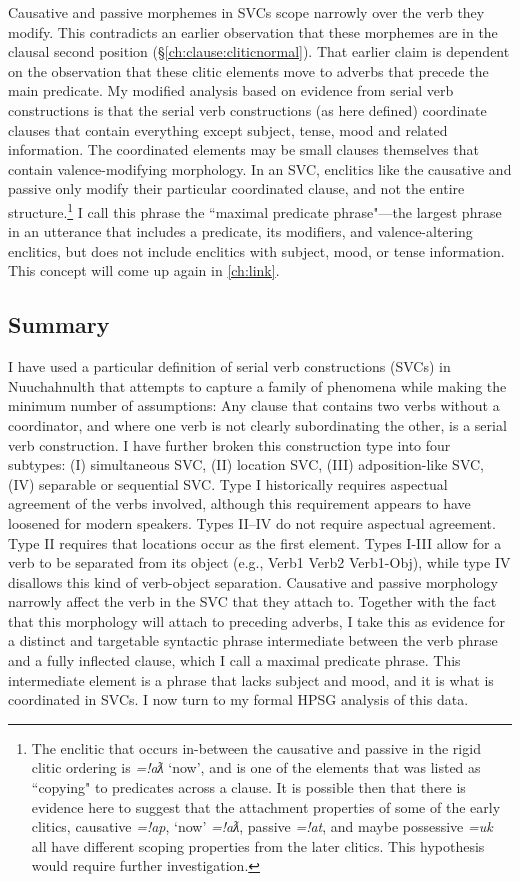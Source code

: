Causative and passive morphemes in SVCs scope narrowly over the verb they modify. This contradicts an earlier observation that these morphemes are in the clausal second position (\S\ref{ch:clause:cliticnormal}). That earlier claim is dependent on the observation that these clitic elements move to adverbs that precede the main predicate. My modified analysis based on evidence from serial verb constructions is that the serial verb constructions (as here defined) coordinate clauses that contain everything except subject, tense, mood and related information. The coordinated elements may be small clauses themselves that contain valence-modifying morphology. In an SVC, enclitics like the causative and passive only modify their particular coordinated clause, and not the entire structure.\footnote{The enclitic that occurs in-between the causative and passive in the rigid clitic ordering is \textit{=!aƛ} `now', and is one of the elements that was listed as ``copying" to predicates across a clause. It is possible then that there is evidence here to suggest that the attachment properties of some of the early clitics, causative \textit{=!ap}, `now' \textit{=!aƛ}, passive \textit{=!at}, and maybe possessive \textit{=uk} all have different scoping properties from the later clitics. This hypothesis would require further investigation.} I call this phrase the ``maximal predicate phrase"---the largest phrase in an utterance that includes a predicate, its modifiers, and valence-altering enclitics, but does not include enclitics with subject, mood, or tense information. This concept will come up again in \cref{ch:link}.

\subsection{Summary}

I have used a particular definition of serial verb constructions (SVCs) in Nuuchahnulth that attempts to capture a family of phenomena while making the minimum number of assumptions: Any clause that contains two verbs without a coordinator, and where one verb is not clearly subordinating the other, is a serial verb construction. I have further broken this construction type into four subtypes: (I) simultaneous SVC, (II) location SVC, (III) adposition-like SVC, (IV) separable or sequential SVC. Type I historically requires aspectual agreement of the verbs involved, although this requirement appears to have loosened for modern speakers. Types II--IV do not require aspectual agreement. Type II requires that locations occur as the first element. Types I-III allow for a verb to be separated from its object (e.g., Verb1 Verb2 Verb1-Obj), while type IV disallows this kind of verb-object separation. Causative and passive morphology narrowly affect the verb in the SVC that they attach to. Together with the fact that this morphology will attach to preceding adverbs, I take this as evidence for a distinct and targetable syntactic phrase intermediate between the verb phrase and a fully inflected clause, which I call a maximal predicate phrase. This intermediate element is a phrase that lacks subject and mood, and it is what is coordinated in SVCs. I now turn to my formal HPSG analysis of this data.

